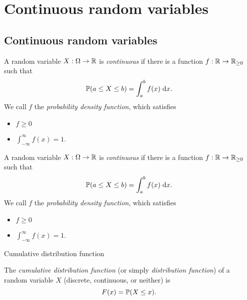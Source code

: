 \section{Continuous random variables}

\subsection{Continuous random variables}

\begin{note}
  \begin{field}
    \begin{defi}
      A random variable $X : \Omega \to \R$ is \emph{continuous} if there is a function $f : \R \to \R_{\geq 0}$ such that
      \[
        \P(a \leq X \leq b) = \int_a^b f(x) \;\d x.
      \]
      We call $f$ the \emph{probability density function}, which satisfies
      \begin{itemize}
        \item $f \geq 0$
        \item $\int_{-\infty}^\infty f(x) = 1$.
      \end{itemize}
    \end{defi}
  \end{field}
  \begin{field}
    \begin{defi}
      A random variable $X : \Omega \to \R$ is \emph{continuous} if there is a function $f : \R \to \R_{\geq 0}$ such that
      \[
        \P(a \leq X \leq b) = \int_a^b f(x) \;\d x.
      \]
      We call $f$ the \emph{probability density function}, which satisfies
      \begin{itemize}
        \item $f \geq 0$
        \item $\int_{-\infty}^\infty f(x) = 1$.
      \end{itemize}
    \end{defi}
  \end{field}
  \xplain{}%
\end{note}

%
\begin{note}
  \begin{field}
    Cumulative distribution function
  \end{field}
  \begin{field}
    \begin{defi}
      The \emph{cumulative distribution function} (or simply \emph{distribution function}) of a random variable $X$ (discrete, continuous, or neither) is
      \[
        F(x) = \P(X \leq x).
      \]
    \end{defi}
  \end{field}
  \xplain{}%
\end{note}

